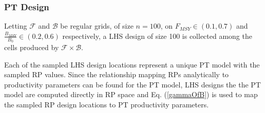 \documentclass[12pt]{article}
\begin{document}
%
 

%
\subsubsection{PT Design}

%
Letting $\mathcal{F}$ and $\mathcal{B}$ be regular grids, of size $n=100$, on
\mbox{$F_{MSY}\in(0.1, 0.7)$} and \mbox{$\frac{B_{MSY}}{B_0}\in(0.2, 0.6)$}
respectively, a LHS design of size 100 is collected among the cells produced by
$\mathcal{F}\times\mathcal{B}$. 

%
Each of the sampled LHS design locations represent a unique PT model with the 
sampled RP values. Since the relationship mapping RPs analytically to productivity 
parameters can be found for the PT model, LHS designs the the PT model are 
computed directly in RP space and Eq. (\ref{gammaOfB}) is used to map the 
sampled RP design locations to PT productivity parameters. 
%
%


\end{document}
